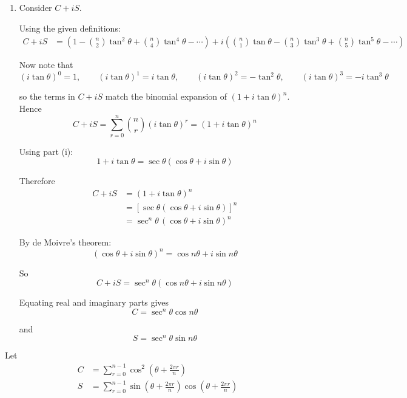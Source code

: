 \documentclass[leqno]{article}
\begin{document}
\begin{enumerate}[
  label=\textbf{\arabic*.},
  leftmargin=*,
  topsep=0pt,
  partopsep=0pt,
  parsep=0pt
]
\begin{djsSolution}
\begin{enumerate}[label=\textbf{(\roman*)}]
Now
\begin{align*}
\sec\theta(\cos\theta+i\sin\theta)
&=\sec\theta\cos\theta+i\sec\theta\sin\theta \\
&=1+i\tan\theta
\end{align*}

as required.

\item Consider \(C+iS\).

Using the given definitions:
\begin{align*}
C+iS
&=\left(1-\binom{n}{2}\tan^2\theta+\binom{n}{4}\tan^4\theta-\cdots\right)
+i\left(\binom{n}{1}\tan\theta-\binom{n}{3}\tan^3\theta+\binom{n}{5}\tan^5\theta-\cdots\right)
\end{align*}

Now note that
\[
(i\tan\theta)^0=1,\qquad
(i\tan\theta)^1=i\tan\theta,\qquad
(i\tan\theta)^2=-\tan^2\theta,\qquad
(i\tan\theta)^3=-i\tan^3\theta
\]

so the terms in \(C+iS\) match the binomial expansion of \((1+i\tan\theta)^n\). Hence
\[
C+iS=\sum_{r=0}^{n}\binom{n}{r}(i\tan\theta)^r=(1+i\tan\theta)^n
\]

Using part (i):
\[
1+i\tan\theta=\sec\theta(\cos\theta+i\sin\theta)
\]

Therefore
\begin{align*}
C+iS
&=(1+i\tan\theta)^n \\
&=\left[\sec\theta(\cos\theta+i\sin\theta)\right]^n \\
&=\sec^n\theta\,(\cos\theta+i\sin\theta)^n
\end{align*}

By de Moivre's theorem:
\[
(\cos\theta+i\sin\theta)^n=\cos n\theta+i\sin n\theta
\]

So
\[
C+iS=\sec^n\theta(\cos n\theta+i\sin n\theta)
\]

Equating real and imaginary parts gives
\[
C=\sec^n\theta\cos n\theta
\]

and
\[
S=\sec^n\theta\sin n\theta
\]
\end{enumerate}
\end{djsSolution}


\newpage

\questionitem

Let
\begin{align*}
C&= \sum_{r=0}^{n-1}\cos^2\left(\theta + \frac{2\pi r}{n}\right)\\[10pt]
S &= \sum_{r=0}^{n-1}\sin\left(\theta + \frac{2\pi r}{n}\right)\cos\left(\theta + \frac{2\pi r}{n}\right)\\
\end{align*}


\end{enumerate}
\end{document}
